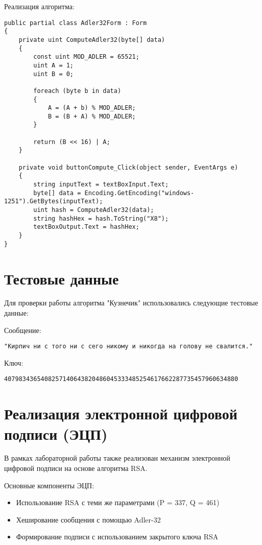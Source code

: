 \documentclass[a4paper, 14pt]{extarticle}
\begin{document}
Реализация алгоритма:
\begin{lstlisting}[caption=Реализация алгоритма Adler-32]
public partial class Adler32Form : Form
{
    private uint ComputeAdler32(byte[] data)
    {
        const uint MOD_ADLER = 65521;
        uint A = 1;
        uint B = 0;

        foreach (byte b in data)
        {
            A = (A + b) % MOD_ADLER;
            B = (B + A) % MOD_ADLER;
        }

        return (B << 16) | A;
    }

    private void buttonCompute_Click(object sender, EventArgs e)
    {
        string inputText = textBoxInput.Text;
        byte[] data = Encoding.GetEncoding("windows-1251").GetBytes(inputText);
        uint hash = ComputeAdler32(data);
        string hashHex = hash.ToString("X8");
        textBoxOutput.Text = hashHex;
    }
}
\end{lstlisting}

\section{Тестовые данные}
Для проверки работы алгоритма "Кузнечик" использовались следующие тестовые данные:

Сообщение:
\begin{lstlisting}
"Кирпич ни с того ни с сего никому и никогда на голову не свалится."
\end{lstlisting}

Ключ:
\begin{lstlisting}
4079834365408257140643820486045333485254617662287735457960634880
\end{lstlisting}

\section{Реализация электронной цифровой подписи (ЭЦП)}
В рамках лабораторной работы также реализован механизм электронной цифровой подписи на основе алгоритма RSA. 

Основные компоненты ЭЦП:
\begin{itemize}
    \item Использование RSA с теми же параметрами (P = 337, Q = 461)
    \item Хеширование сообщения с помощью Adler-32
    \item Формирование подписи с использованием закрытого ключа RSA
\end{itemize}
\end{document}
